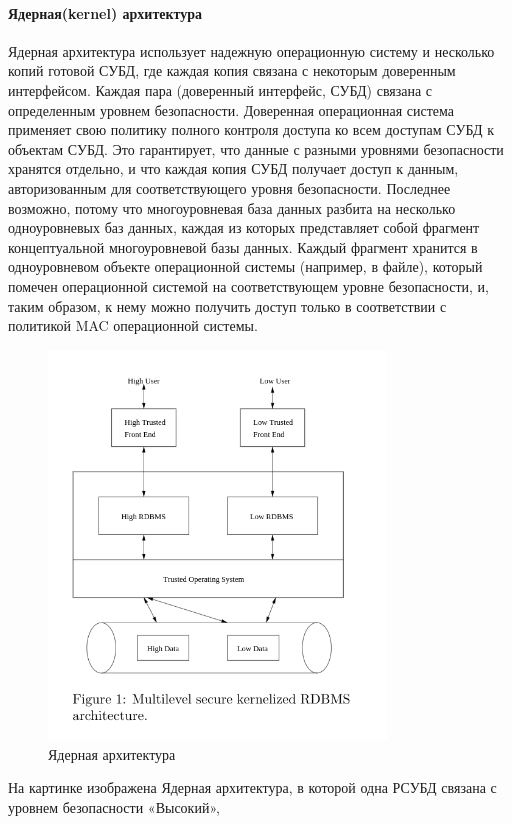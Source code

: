 \paragraph{Ядерная(kernel) архитектура}
Ядерная архитектура использует надежную операционную систему и несколько копий готовой СУБД,
где каждая копия связана с некоторым доверенным интерфейсом. Каждая пара (доверенный интерфейс, СУБД)
связана с определенным уровнем безопасности. Доверенная операционная система применяет свою политику
полного контроля доступа ко всем доступам СУБД к объектам СУБД. Это гарантирует, что данные с разными
уровнями безопасности хранятся отдельно, и что каждая копия СУБД получает доступ к данным, авторизованным
для соответствующего уровня безопасности. Последнее возможно, потому что многоуровневая база данных разбита
на несколько одноуровневых баз данных, каждая из которых представляет собой фрагмент
концептуальной многоуровневой базы данных. Каждый фрагмент хранится в одноуровневом объекте операционной
системы (например, в файле), который помечен операционной системой на соответствующем уровне безопасности,
и, таким образом, к нему можно получить доступ только в соответствии с политикой MAC операционной системы.
\begin{figure}[H]
    \centering
    \includegraphics[width=0.8\textwidth]{assets/security/kernel.png}
    \caption{Ядерная архитектура}
    \label{fig:mesh01}
\end{figure}
На картинке изображена Ядерная архитектура, в которой одна РСУБД связана с уровнем безопасности «Высокий»,
